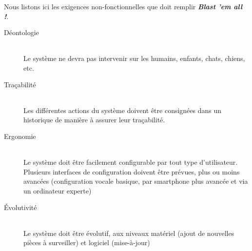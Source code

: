 Nous listons ici les exigences non-fonctionnelles que doit remplir 
\textit{\textbf{Blast 'em all !}}.
\begin{description}
\item[Déontologie]\hfill\\
Le système ne devra pas intervenir sur les humains, enfants, chats, chiens, etc.
\item[Traçabilité]\hfill\\
Les différentes actions du système doivent être consignées dans un
historique de manière à assurer leur traçabilité.
\item[Ergonomie]\hfill\\
Le système doit être facilement configurable par tout type d'utilisateur.
Plusieurs interfaces de configuration doivent être prévues, plus ou moins
avancées (configuration vocale basique, par smartphone plus avancée et via
un ordinateur experte)
\item[Évolutivité]\hfill\\
Le système doit être évolutif, aux niveaux matériel (ajout de nouvelles
pièces à surveiller) et logiciel (mise-à-jour)
\end{description}

\vfill
\pagebreak
